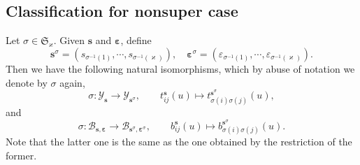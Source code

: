 \documentclass[11pt,reqno]{amsart}
\numberwithin{equation}{section}
\newtheorem{lem}[thm]{Lemma}
\theoremstyle{definition}
\theoremstyle{remark}
\newcommand{\beq}{\begin{equation}}
\newcommand{\eeq}{\end{equation}}
\newcommand{\gl}{\mathfrak{gl}}
\newcommand{\bC}{\mathbb{C}}
\newcommand{\tl}{\tilde}
\newcommand{\lle}{\leqslant}
\newcommand{\la}{\lambda}
\newcommand{\YMN}{{\mathscr{Y}_{\bm s}}}
\newcommand{\BMN}{{\mathscr{B}_{\bm s,\bm \ve}}}
\newcommand{\BME}{{\mathscr{B}_{m,\bm \ve}}}
\newcommand{\ka}{\varkappa}
\newcommand{\ve}{\varepsilon}
\newcommand{\s}{{\bm s}}
\begin{document}



\subsection{Classification for nonsuper case}
Let $\sigma\in \mathfrak S_{\ka}$. Given $\s$ and $\bm\ve$,
define
\[
\s^{\sigma}=(s_{\sigma^{-1}(1)},\cdots,s_{\sigma^{-1}(\ka)}), \quad \bm\ve^{\sigma}=(\ve_{\sigma^{-1}(1)},\cdots,\ve_{\sigma^{-1}(\ka)}).
\]
Then we have the following natural isomorphisms, which by abuse of notation we denote by $\sigma$ again,
\beq\label{sigmaY}
\sigma:\YMN\to \mathscr Y_{\s^\sigma},\qquad  t_{ij}^\s(u)\mapsto t_{\sigma(i)\sigma(j)}^{\s^\sigma}(u),
\eeq
and
\beq\label{sigmaB}
\sigma:\BMN\to \mathscr B_{\s^\sigma,\bm \ve^\sigma},\qquad b_{ij}^\s(u)\mapsto b_{\sigma(i)\sigma(j)}^{\s^\sigma}(u).
\eeq
Note that the latter one is the same as the one obtained by the restriction of the former.
\end{document}
